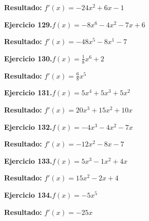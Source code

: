 \documentclass[10pt,a4paper]{article}
\begin{document}
\begin{solbox}
\textbf{Resultado:} \(\displaystyle f'(x) = -24x^2 +6x -1\)
\end{solbox}

\begin{ejbox}
\textbf{Ejercicio 129.}\quad $f(x) = -8x^{6} -4x^{2} -7x +6$
\end{ejbox}

\begin{solbox}
\textbf{Resultado:} \(\displaystyle f'(x) = -48x^{5} -8x^{1} -7\)
\end{solbox}

\newpage
\begin{ejbox}
\textbf{Ejercicio 130.}\quad $f(x) = \frac{1}{8}x^{6} +2$
\end{ejbox}

\begin{solbox}
\textbf{Resultado:} \(\displaystyle f'(x) = \frac{6}{8}x^{5}\)
\end{solbox}

\begin{ejbox}
\textbf{Ejercicio 131.}\quad $f(x) = 5x^4 +5x^3 +5x^2$
\end{ejbox}

\begin{solbox}
\textbf{Resultado:} \(\displaystyle f'(x) = 20x^3 +15x^2 +10x\)
\end{solbox}

\begin{ejbox}
\textbf{Ejercicio 132.}\quad $f(x) = -4x^3 -4x^2 -7x$
\end{ejbox}

\begin{solbox}
\textbf{Resultado:} \(\displaystyle f'(x) = -12x^2 -8x -7\)
\end{solbox}

\newpage
\begin{ejbox}
\textbf{Ejercicio 133.}\quad $f(x) = 5x^3 -1x^2 +4x$
\end{ejbox}

\begin{solbox}
\textbf{Resultado:} \(\displaystyle f'(x) = 15x^2 -2x +4\)
\end{solbox}

\begin{ejbox}
\textbf{Ejercicio 134.}\quad $f(x) = -5x^{5}$
\end{ejbox}

\begin{solbox}
\textbf{Resultado:} \(\displaystyle f'(x) = -25x\)
\end{solbox}
\end{document}
